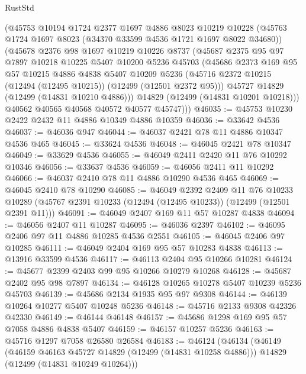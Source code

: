 \begin{lexlean}{RustStd}
\begin{coremodule}
      (@45753
        @10194
        @1724
        @2377
        @1697
        @4886
        @8023
        @10219
        @10228
        (@45763 @1724 @1697 @8023 (@34370 @33599 @4536 @1721 @1697 @8022 @34680))
        (@45678
          @2376
          @98
          @1697
          @10219
          @10226
          @8737
          (@45687
            @2375
            @95
            @97
            @7897
            @10218
            @10225
            @5407
            @10200
            @5236
            @45703
            (@45686
              @2373
              @169
              @95
              @57
              @10215
              @4886
              @4838
              @5407
              @10209
              @5236
              (@45716 @2372 @10215 (@12494 (@12495 @10215)) (@12499 (@12501 @2372 @95)))
              @45727
              @14829
              (@12499 (@14831 @10210 @4886)))
            @14829
            (@12499 (@14831 @10201 @10218)))
          @40562
          @40565
          @40568
          @40572
          @40577
          @45747)))
@46035 := @45753 @10230 @2422 @2432 @11 @4886 @10349 @4886 @10359
@46036 := @33642 @4536
@46037 := @46036 @947
@46044 := @46037 @2421 @78 @11 @4886 @10347 @4536 @465
@46045 := @33624 @4536
@46048 := @46045 @2421 @78 @10347
@46049 := @33629 @4536
@46055 := @46049 @2411 @2420 @11 @76 @10292 @10346
@46056 := @33637 @4536
@46059 := @46056 @2411 @11 @10292
@46066 := @46037 @2410 @78 @11 @4886 @10290 @4536 @465
@46069 := @46045 @2410 @78 @10290
@46085 := @46049
    @2392
    @2409
    @11
    @76
    @10233
    @10289
    (@45767 @2391 @10233 (@12494 (@12495 @10233)) (@12499 (@12501 @2391 @11)))
@46091 := @46049 @2407 @169 @11 @57 @10287 @4838
@46094 := @46056 @2407 @11 @10287
@46095 := @46036 @2397
@46102 := @46095 @2406 @97 @11 @4886 @10285 @4536 @2551
@46105 := @46045 @2406 @97 @10285
@46111 := @46049 @2404 @169 @95 @57 @10283 @4838
@46113 := @13916 @33599 @4536
@46117 := @46113 @2404 @95 @10266 @10281
@46124 := @45677 @2399 @2403 @99 @95 @10266 @10279 @10268
@46128 := @45687 @2402 @95 @98 @7897
@46134 := @46128 @10265 @10278 @5407 @10239 @5236 @45703
@46139 := @45686 @2134 @1935 @95 @97 @9308
@46144 := @46139 @10264 @10277 @5407 @10248 @5236
@46148 := @45716 @2133 @9308 @42326 @42330
@46149 := @46144 @46148
@46157 := @45686 @1298 @169 @95 @57 @7058 @4886 @4838 @5407
@46159 := @46157 @10257 @5236
@46163 := @45716 @1297 @7058 @26580 @26584
@46183 := @46124
    (@46134
      (@46149
        (@46159 @46163 @45727 @14829 (@12499 (@14831 @10258 @4886)))
        @14829
        (@12499 (@14831 @10249 @10264)))

\end{coremodule}
\end{lexlean}
